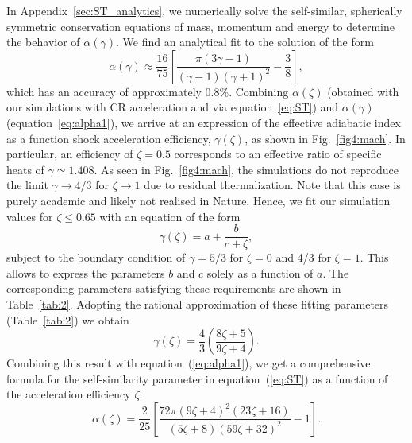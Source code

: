 \documentclass[8pt,a4paper,usenatbib]{mnras}
\begin{document}
In Appendix~\ref{sec:ST_analytics}, we numerically solve the self-similar, spherically
symmetric conservation equations of mass, momentum and energy to determine the
behavior of $\alpha(\gamma)$. We find an analytical fit to the solution of the
form
\begin{equation}
  \label{eq:alpha1}
  \alpha(\gamma) \approx \dfrac{16}{75}
  \left[ \dfrac{\pi (3\gamma-1)}{(\gamma-1)(\gamma+1)^2} -\dfrac{3}{8}\right],  
\end{equation} 
which has an accuracy of approximately 0.8\%. Combining $\alpha(\zeta)$
(obtained with our simulations with CR acceleration and via
equation~\ref{eq:ST}) and $\alpha(\gamma)$ (equation~\ref{eq:alpha1}), we arrive
at an expression of the effective adiabatic index as a function shock
acceleration efficiency, $\gamma(\zeta)$, as shown in Fig.~\ref{fig4:mach}. In
particular, an efficiency of $\zeta = 0.5$ corresponds to an effective ratio of
specific heats of $\gamma \simeq 1.408$. As seen in Fig.~\ref{fig4:mach}, the
simulations do not reproduce the limit $\gamma\to4/3$ for $\zeta\to1$ due to
residual thermalization. Note that this case is purely academic and likely not realised in
Nature. Hence, we fit our simulation values for $\zeta\leq0.65$ with an equation
of the form
\begin{equation}
 \label{eq:alpha2}
 \gamma(\zeta) = a + \dfrac{b}{c + \zeta},
\end{equation} 
subject to the boundary condition of $\gamma= 5/3$ for $\zeta = 0$ and 4/3 for
$\zeta = 1$. This allows to express the parameters $b$ and $c$ solely as a
function of $a$.  The corresponding parameters satisfying these requirements are
shown in Table~\ref{tab:2}. Adopting the rational approximation of these fitting
parameters (Table~\ref{tab:2}) we obtain
\begin{equation}
\gamma(\zeta) = \dfrac{4}{3} \left( \dfrac{8 \zeta + 5}{9 \zeta + 4} \right).
\end{equation}
Combining this result with equation~(\ref{eq:alpha1}), we get a comprehensive formula
for the self-similarity parameter in equation~(\ref{eq:ST}) as a function of the
acceleration efficiency $\zeta$:
\begin{equation}
\label{eq:alpha_final}
\alpha({\zeta}) = \dfrac{2}{25}
\left[\dfrac{72 \pi (9 \zeta + 4)^2 (23 \zeta + 16)}{(5 \zeta + 8) (59 \zeta + 32)^2} - 1\right].
\end{equation}
\end{document}
